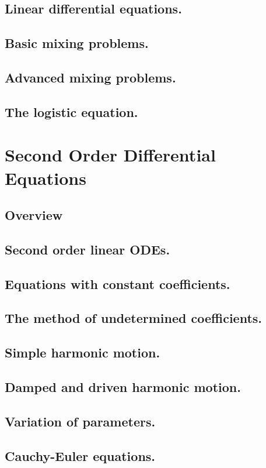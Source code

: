 \documentclass{article}
\begin{document}
\subsection{Linear differential equations.}
\subsection{Basic mixing problems.}
\subsection{Advanced mixing problems.}
\subsection{The logistic equation.}

\pagebreak
\section{Second Order Differential Equations}
\subsection*{Overview}

\subsection{Second order linear ODEs.}
\subsection{Equations with constant coefficients.}
\subsection{The method of undetermined coefficients.}
\subsection{Simple harmonic motion.}
\subsection{Damped and driven harmonic motion.}
\subsection{Variation of parameters.}
\subsection{Cauchy-Euler equations.}
\end{document}
